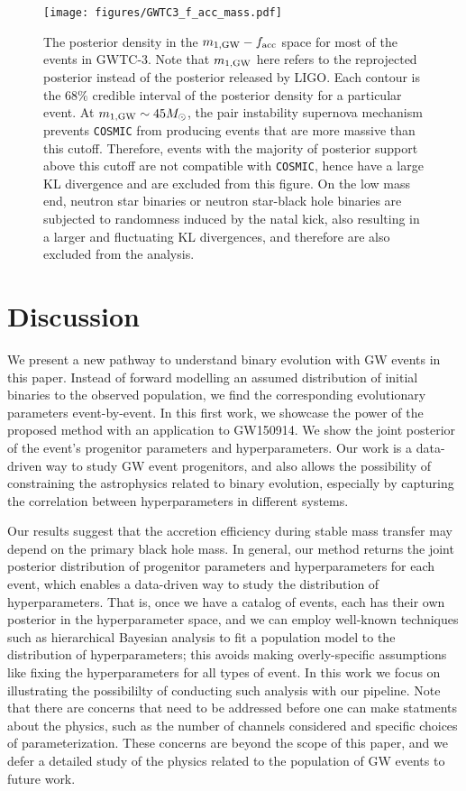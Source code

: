 \documentclass[linenumbers,twocolumn]{aastex631}
\begin{document}
\begin{figure}
\texttt{[image: figures/GWTC3\_f\_acc\_mass.pdf]}
\caption{ The posterior density in the $m_{1,{\rm GW}}-f_{\rm acc}$ space for
    most of the events in GWTC-3. Note that $m_{1,{\rm GW}}$ here refers to the
    reprojected posterior instead of the posterior released by LIGO. Each
    contour is the $68\%$ credible interval of the posterior density for a
    particular event. At $m_{1,{\rm GW}} \sim 45 M_{\odot}$, the pair
    instability supernova mechanism prevents \texttt{COSMIC} from producing
    events that are more massive than this cutoff. Therefore, events with the
    majority of posterior support above this cutoff are not compatible with
    \texttt{COSMIC}, hence have a large KL divergence and are excluded from this
    figure. On the low mass end, neutron star binaries or neutron star-black
    hole binaries are subjected to randomness induced by the natal kick, also
    resulting in a larger and fluctuating KL divergences, and therefore are also
    excluded from the analysis. }
\label{fig:GWTC-3_f_acc_mass}
\end{figure}

\section{Discussion}
\label{sec:discussion}


We present a new pathway to understand binary evolution with GW events in this
paper. Instead of forward modelling an assumed distribution of initial binaries
to the observed population, we find the corresponding evolutionary parameters
event-by-event. In this first work, we showcase the power of the proposed method
with an application to GW150914. We show the joint posterior of the event's
progenitor parameters and hyperparameters.  Our work is a data-driven
way to study GW event progenitors, and also allows the possibility of
constraining the astrophysics related to binary evolution, especially by
capturing the correlation between hyperparameters in different systems.

Our results suggest that the accretion efficiency during stable mass transfer
may depend on the primary black hole mass.  In general, our method returns the
joint posterior distribution of progenitor parameters and hyperparameters for
each event, which enables a data-driven way to study the distribution of
hyperparameters.  That is, once we have a catalog of events, each has their own
posterior in the hyperparameter space, and we can employ well-known techniques
such as hierarchical Bayesian analysis to fit a population model to the
distribution of hyperparameters; this avoids making overly-specific assumptions
like fixing the hyperparameters for all types of event. In this work we
focus on illustrating the possibililty of conducting such analysis with our
pipeline. Note that there are concerns that need to be addressed before one can
make statments about the physics, such as the number of channels considered and
specific choices of parameterization. These concerns are beyond the scope of
this paper, and we defer a detailed study of the physics related to the
population of GW events to future work.
\end{document}
